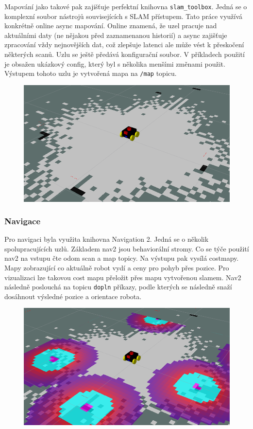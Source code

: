 Mapování jako takové pak zajišťuje perfektní knihovna \verb|slam_toolbox|. Jedná se o komplexní soubor nástrojů souvisejících s SLAM přístupem. Tato práce využívá konkrétně online async mapování. Online znamená, že uzel pracuje nad aktuálními daty (ne nějakou před zaznamenanou historií) a async zajišťuje zpracování vždy nejnovějších dat, což zlepšuje latenci ale může vést k přeskočení některých scanů. Uzlu se ještě předává konfigurační soubor. V příkladech použití je obsažen ukázkový config, který byl s několika menšími změnami použit. Výstupem tohoto uzlu je vytvořená mapa na \verb|/map| topicu.

\begin{figure}[h!]
	\centering
	\includegraphics[scale=0.4]{obrazky-figures/slam.png}
	\caption{}
	\label{}
\end{figure}

\subsubsection*{Navigace}
Pro navigaci byla využita knihovna Navigation 2. Jedná se o několik spolupracujících uzlů. Základem nav2 jsou behaviorální stromy. Co se týče použití nav2 na vstupu čte odom scan a map topicy. Na výstupu pak vysílá costmapy. Mapy zobrazující co aktuálně robot vydí a ceny pro pohyb přes pozice. Pro vizualizaci lze takovou cost mapu přeložit přes mapu vytvořenou slamem. Nav2 následně poslouchá na topicu \verb|dopln| příkazy, podle kterých se následně snaží dosáhnout výsledné pozice a orientace robota. 

\begin{figure}[h!]
	\centering
	\includegraphics[scale=0.4]{obrazky-figures/nav2.png}
	\caption{}
	\label{}
\end{figure}

